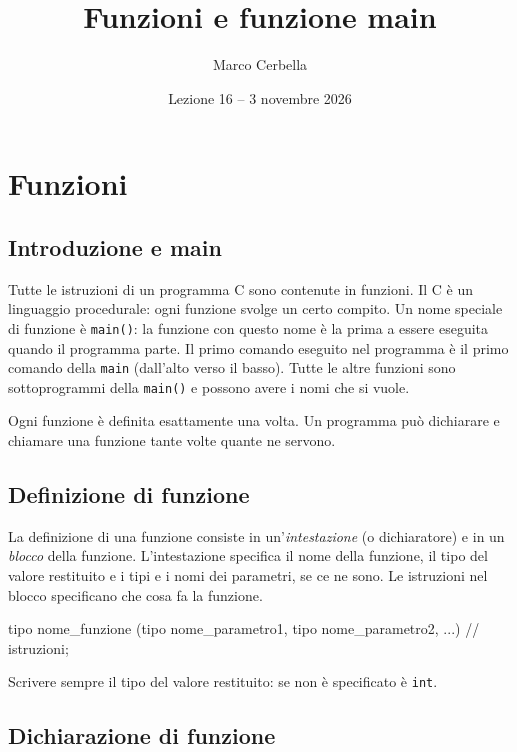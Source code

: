 \documentclass[11pt,a4paper]{article}
\title{Funzioni e funzione main}
\author{Marco Cerbella}
\date{Lezione 16 -- 3 novembre 2026}
\begin{document}
\maketitle

\section{Funzioni}

\subsection{Introduzione e main}

Tutte le istruzioni di un programma C sono contenute in funzioni. Il C è un linguaggio procedurale: ogni funzione svolge un certo compito. Un nome speciale di funzione è \lstinline|main()|: la funzione con questo nome è la prima a essere eseguita quando il programma parte. Il primo comando eseguito nel programma è il primo comando della \lstinline|main| (dall'alto verso il basso). Tutte le altre funzioni sono sottoprogrammi della \lstinline|main()| e possono avere i nomi che si vuole.

Ogni funzione è definita esattamente una volta. Un programma può dichiarare e chiamare una funzione tante volte quante ne servono.

\subsection{Definizione di funzione}

La definizione di una funzione consiste in un'\emph{intestazione} (o dichiaratore) e in un \emph{blocco} della funzione. L'intestazione specifica il nome della funzione, il tipo del valore restituito e i tipi e i nomi dei parametri, se ce ne sono. Le istruzioni nel blocco specificano che cosa fa la funzione.
\begin{codice}
tipo nome_funzione (tipo nome_parametro1, tipo nome_parametro2, ...) {
    // istruzioni;
}
\end{codice}

\begin{osservazione}
Scrivere sempre il tipo del valore restituito: se non è specificato è \lstinline|int|.
\end{osservazione}

\subsection{Dichiarazione di funzione}
\end{document}
